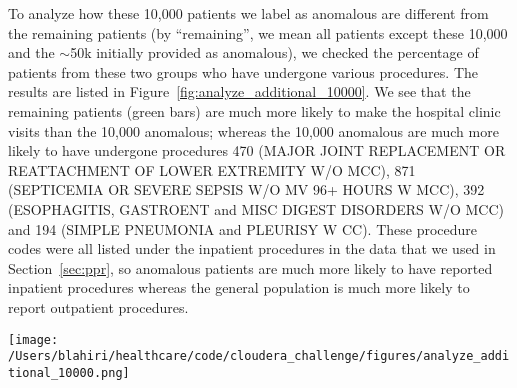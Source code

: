To analyze how these 10,000 patients we label as anomalous are different from the remaining patients (by ``remaining'', we mean all patients except these 10,000 and the $\sim$50k initially provided as anomalous), we checked the percentage of patients from these two groups who have undergone various procedures. The results are listed in Figure~\ref{fig:analyze_additional_10000}. We see that the remaining patients (green bars) are much more likely to make the hospital clinic visits than the 10,000 anomalous; whereas the 10,000 anomalous are much more likely to have undergone procedures 470 (MAJOR JOINT REPLACEMENT OR REATTACHMENT OF LOWER EXTREMITY W/O MCC), 871 (SEPTICEMIA OR SEVERE SEPSIS W/O MV 96+ HOURS W MCC), 392 (ESOPHAGITIS, GASTROENT and MISC DIGEST DISORDERS W/O MCC) and 194 (SIMPLE PNEUMONIA and PLEURISY W CC). These procedure codes were all listed under the inpatient procedures in the data that we used in Section~\ref{sec:ppr}, so anomalous patients are much more likely to have reported inpatient procedures whereas the general population is much more likely to report outpatient procedures. 

\begin{figure*}[!h]
    \centering
    \texttt{[image: /Users/blahiri/healthcare/code/cloudera\_challenge/figures/analyze\_additional\_10000.png]}
    \caption{\small Percentage of patients from 10,000 anomalous vs remaining undergoing various procedures. Green bars are much higher than red ones for procedures 0604, 0605, 0606, 0607; whereas red bars are much higher than green bars for procedures 470 and 871.}
    \label{fig:analyze_additional_10000}
\end{figure*} 
